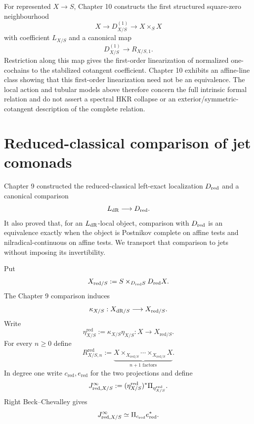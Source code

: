 \begin{remark}
For represented $X\to S$, Chapter 10 constructs the first structured square-zero neighbourhood
\[
    X\longrightarrow D^{(1)}_{X/S}\longrightarrow X\times_SX
\]
with coefficient $L_{X/S}$ and a canonical map
\[
    D^{(1)}_{X/S}\longrightarrow R_{X/S,1}.
\]
Restriction along this map gives the first-order linearization of normalized one-cochains to the stabilized cotangent coefficient.  Chapter 10 exhibits an affine-line class showing that this first-order linearization need not be an equivalence.  The local action and tubular models above therefore concern the full intrinsic formal relation and do not assert a spectral HKR collapse or an exterior/symmetric-cotangent description of the complete relation.
\end{remark}

\section{Reduced-classical comparison of jet comonads}
\label{sec:jet-comparison}

Chapter 9 constructed the reduced-classical left-exact localization $D_{\mathrm{red}}$ and a canonical comparison
\[
    L_{\mathrm{dR}}\longrightarrow D_{\mathrm{red}}.
\]
It also proved that, for an $L_{\mathrm{dR}}$-local object, comparison with $D_{\mathrm{red}}$ is an equivalence exactly when the object is Postnikov complete on affine tests and nilradical-continuous on affine tests.  We transport that comparison to jets without imposing its invertibility.

\begin{definition}
\label{def:reduced-jet}
Put
\[
    X_{\mathrm{red}/S}:=
    S\times_{D_{\mathrm{red}} S}D_{\mathrm{red}} X.
\]
The Chapter 9 comparison induces
\[
    \kappa_{X/S}:X_{\mathrm{dR}/S}\longrightarrow X_{\mathrm{red}/S}.
\]
Write
\[
    \eta^{\mathrm{red}}_{X/S}
    :=
    \kappa_{X/S}\eta_{X/S}:
    X\longrightarrow X_{\mathrm{red}/S}.
\]
For every $n\geq0$ define
\[
    R^{\mathrm{red}}_{X/S,n}
    :=
    \underbrace{
    X\times_{X_{\mathrm{red}/S}}\cdots
    \times_{X_{\mathrm{red}/S}}X
    }_{n+1\text{ factors}}.
\]
In degree one write $c_{\mathrm{red}},e_{\mathrm{red}}$ for the two projections and define
\[
    J^{\infty}_{\mathrm{red},X/S}
    :=
    (\eta^{\mathrm{red}}_{X/S})^*
    \Pi_{\eta^{\mathrm{red}}_{X/S}}.
\]
Right Beck--Chevalley gives
\[
    J^{\infty}_{\mathrm{red},X/S}
    \simeq
    \Pi_{c_{\mathrm{red}}}e_{\mathrm{red}}^*.
\]
\end{definition}

